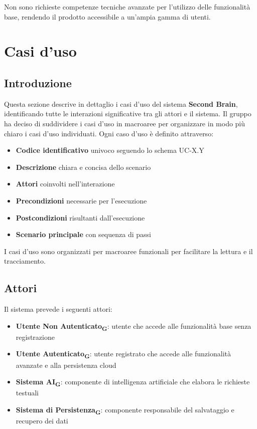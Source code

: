 \documentclass[11pt,a4paper]{article}
\begin{document}
Non sono richieste competenze tecniche avanzate per l'utilizzo delle funzionalità base, rendendo il prodotto accessibile a un'ampia gamma di utenti.

\newpage

\section{Casi d'uso}
\subsection{Introduzione}
Questa sezione descrive in dettaglio i casi d'uso del sistema \textbf{Second Brain}, identificando tutte le interazioni significative tra gli attori e il sistema. Il gruppo ha deciso di suddividere i casi d'uso in macroaree per organizzare in modo più chiaro i casi d'uso individuati. Ogni caso d'uso è definito attraverso:

\begin{itemize}
    \item \textbf{Codice identificativo} univoco seguendo lo schema UC-X.Y
    \item \textbf{Descrizione} chiara e concisa dello scenario
    \item \textbf{Attori} coinvolti nell'interazione
    \item \textbf{Precondizioni} necessarie per l'esecuzione
    \item \textbf{Postcondizioni} risultanti dall'esecuzione
    \item \textbf{Scenario principale} con sequenza di passi
\end{itemize}

I casi d'uso sono organizzati per macroaree funzionali per facilitare la lettura e il tracciamento.

\subsection{Attori}
Il sistema prevede i seguenti attori:

\begin{itemize}
    \item \textbf{Utente Non Autenticato\textsubscript{G}}: utente che accede alle funzionalità base senza registrazione
    \item \textbf{Utente Autenticato\textsubscript{G}}: utente registrato che accede alle funzionalità avanzate e alla persistenza cloud
    \item \textbf{Sistema AI\textsubscript{G}}: componente di intelligenza artificiale che elabora le richieste testuali
    \item \textbf{Sistema di Persistenza\textsubscript{G}}: componente responsabile del salvataggio e recupero dei dati
\end{itemize}
\end{document}
